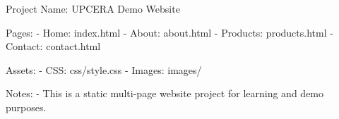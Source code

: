 Project Name: UPCERA Demo Website

Pages:
- Home: index.html
- About: about.html
- Products: products.html
- Contact: contact.html

Assets:
- CSS: css/style.css
- Images: images/

Notes:
- This is a static multi-page website project for learning and demo purposes.